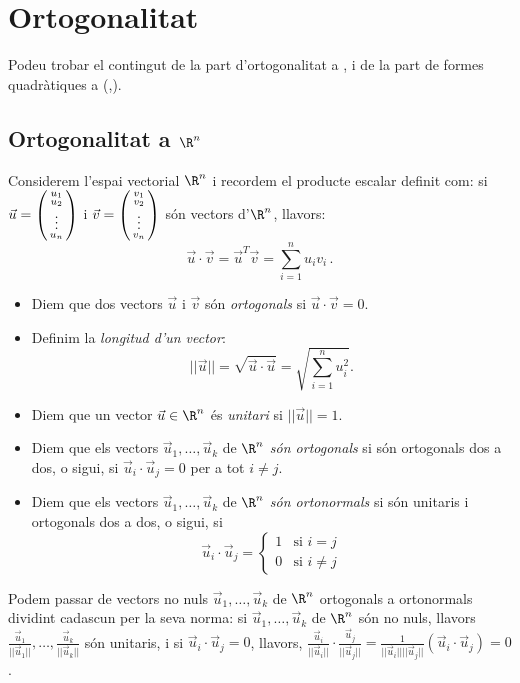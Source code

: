 

\section{Ortogonalitat} 
Podeu trobar el contingut de la part d'ortogonalitat a \cite[Tema 5]{Bret}, i de la part de formes quadràtiques a (\cite[Tema~8]{Bret},\cite[Tema~4]{NaXa}).
\subsection{Ortogonalitat a \texorpdfstring{$\R^n$}{Rn}}
Considerem l'espai vectorial $\R^n$ i recordem el producte escalar definit com: si $\vec u=\left(\begin{smallmatrix}u_1\\u_2\\ \vdots\\u_n\end{smallmatrix}\right)$ i $\vec v=\left(\begin{smallmatrix}v_1\\v_2\\ \vdots \\ v_n\end{smallmatrix}\right)$ són vectors d'$\R^n$, llavors:
$$
\vec u \cdot \vec v = \vec u^T \vec v=\sum_{i=1}^n u_iv_i \,.
$$
\begin{definicio}
\begin{itemize}
    \item Diem que dos vectors $\vec u$ i $\vec v$ són \emph{ortogonals} si $\vec u\cdot\vec v=0$.
    \item Definim la \emph{longitud d'un vector}:
    $$
    ||\vec u||=\sqrt{\vec u\cdot \vec u}=\sqrt{\sum_{i=1}^n u_i^2}.
    $$
    \item Diem que un vector $\vec u\in\R^n$ és \emph{unitari} si $||\vec u||=1$.
    \item Diem que els vectors $\vec u_1, \dots, \vec u_k$ de $\R^n$ \emph{són ortogonals} si són ortogonals dos a dos, o sigui, si $\vec u_i\cdot\vec u_j=0$ per a tot $i\neq j$.
    \item Diem que els vectors $\vec u_1, \dots, \vec u_k$ de $\R^n$ \emph{són ortonormals} si són unitaris i ortogonals dos a dos, o sigui, si 
    $$\vec u_i\cdot\vec u_j=\left\{ \begin{array}{ll} 1 & \text{si $i=j$} \\ 0 & \text{si $i\neq j$}\end{array}\right.$$
\end{itemize}
\end{definicio}
\begin{observacio}
Podem passar de vectors no nuls $\vec u_1, \dots, \vec u_k$ de $\R^n$ ortogonals a ortonormals dividint cadascun per la seva norma: si $\vec u_1, \dots, \vec u_k$ de $\R^n$ són no nuls, llavors $\frac{\vec u_1}{||\vec u_1||}, \dots, \frac{\vec u_k}{||\vec u_k||}$ són unitaris, i si $\vec u_i\cdot \vec u_j=0$, llavors, $\frac{\vec u_i}{||\vec u_i||}\cdot \frac{\vec u_j}{||\vec u_j||}=\frac{1}{||\vec u_i|| ||\vec u_j||}(\vec u_i\cdot \vec u_j)=0$.
\end{observacio}
